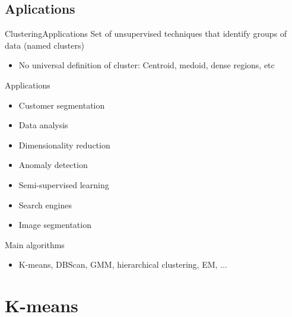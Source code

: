 \documentclass[10pt,compress]{beamer} %
\begin{document}
\subsection{Aplications}
\begin{frame}{Clustering}{Applications}
	Set of unsupervised techniques that identify groups of data (named \alert{clusters})
    \begin{itemize}
        \item No universal definition of cluster: Centroid, medoid, dense regions, etc
    \end{itemize}

    Applications
	\begin{itemize}
		\item Customer segmentation
           \item Data analysis
           \item Dimensionality reduction
           \item Anomaly detection
           \item Semi-supervised learning
           \item Search engines
           \item Image segmentation
	\end{itemize}

    Main algorithms
	\begin{itemize}
		\item K-means, DBScan, GMM, hierarchical clustering, EM, ...
	\end{itemize}
\end{frame}

\section{K-means}
\end{document}

